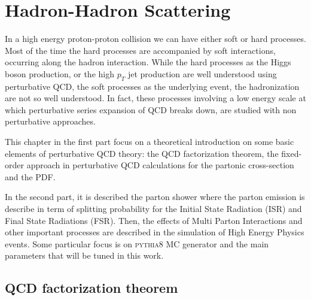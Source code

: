 %
%
%

%


\chapter{Hadron-Hadron Scattering}
\label{chap:Hadron-HadronScattering}

In a high energy proton-proton collision we can have either soft or hard processes.
Most of the time the hard processes are accompanied by soft interactions, occurring along the hadron interaction.
While the hard processes as the Higgs boson production, or the high $p_T$ jet production are well understood using perturbative QCD, the soft processes as the underlying event, the hadronization are not so well understood. In fact, these processes involving a low energy scale at which perturbative series expansion of QCD breaks down, are studied with non perturbative approaches. 

This chapter in the first part focus on a theoretical introduction on some basic elements of perturbative QCD theory: the QCD factorization theorem, the fixed-order approach in perturbative QCD calculations for the partonic cross-section and the PDF.  

\noindent In the second part, it is described the parton shower where the parton emission is describe in term of splitting probability for the Initial State Radiation (ISR) and Final State Radiations (FSR). Then, the effects of Multi Parton Interactions and other important processes are described in the simulation of High Energy Physics events. Some particular focus is on \textsc{pythia}8 MC generator and the main parameters that will be tuned in this work.


\section{QCD factorization theorem}

